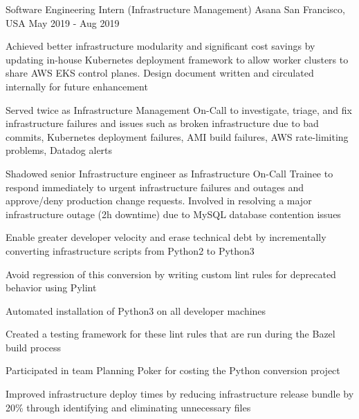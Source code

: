 

\begin{cventries}


  \cventry
  {Software Engineering Intern (Infrastructure Management)} %
    {Asana} %
    {San Francisco, USA} %
    {May 2019 - Aug 2019} %
    {
      \begin{cvitems} %
      \item {Achieved better infrastructure modularity and significant cost savings by updating in-house Kubernetes deployment framework to allow worker clusters to share AWS EKS control planes. Design document written and circulated internally for future enhancement}
      \item {Served twice as Infrastructure Management On-Call to investigate, triage, and fix infrastructure failures and issues such as broken infrastructure due to bad commits, Kubernetes deployment failures, AMI build failures, AWS rate-limiting problems, Datadog alerts}
      \item {Shadowed senior Infrastructure engineer as Infrastructure On-Call Trainee to respond immediately to urgent infrastructure failures and outages and approve/deny production change requests. Involved in resolving a major infrastructure outage (2h downtime) due to MySQL database contention issues}
      \item {Enable greater developer velocity and erase technical debt by incrementally converting infrastructure scripts from Python2 to Python3}
      \item {Avoid regression of this conversion by writing custom lint rules for deprecated behavior using Pylint}
      \item {Automated installation of Python3 on all developer machines}
      \item {Created a testing framework for these lint rules that are run during the Bazel build process}
      \item {Participated in team Planning Poker for costing the Python conversion project}
      \item {Improved infrastructure deploy times by reducing infrastructure release bundle by 20\% through identifying and eliminating unnecessary files}
      \end{cvitems}
    }


\end{cventries}

